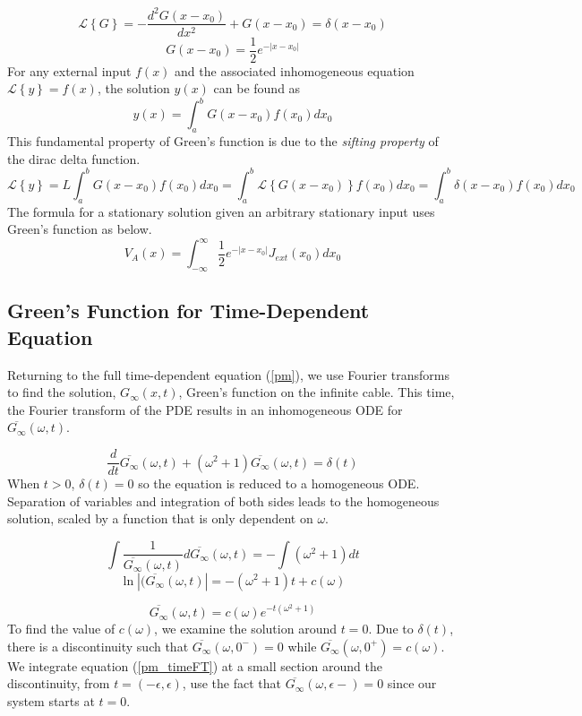 \documentclass[12pt]{article}
\begin{document}
\begin{equation} \label{pm_greens}
\mathcal{L}\left\{G\right\} = -\frac{d^2{G(x-x_0)}}{d{x^2}} + G(x-x_0) = \delta(x-x_0)
\end{equation}
$$ G(x-x_0) = \frac{1}{2}e^{-| x-x_0 |} $$
For any external input $f(x)$ and the associated inhomogeneous equation $\mathcal{L}\left\{y\right\} = f(x)$, the solution $y(x)$ can be found as
$$ y(x) = \int_{a}^{b}G(x-x_0)f(x_0)dx_0 $$
This fundamental property of Green's function is due to the \textit{sifting property} of the dirac delta function. 
$$\mathcal{L}\left\{y\right\} = L\int_a^bG(x-x_0)f(x_0)dx_0 = \int_a^b\mathcal{L}\left\{G(x-x_0)\right\}f(x_0)dx_0 = \int_a^b\delta(x-x_0)f(x_0)dx_0 $$
The formula for a stationary solution given an arbitrary stationary input uses Green's function as below.
$$V_A(x) = \int_{-\infty}^{\infty}\frac{1}{2}e^{-|x-x_0|}J_{ext}(x_0)dx_0 $$

\subsection{Green's Function for Time-Dependent Equation}
Returning to the full time-dependent equation (\ref{pm}), we use Fourier transforms to find the solution, $G_{\infty}(x,t)$, Green's function on the infinite cable. This time, the Fourier transform of the PDE results in an inhomogeneous ODE for $\overline{G_{\infty}}(\omega,t)$.

\begin{equation}\label{pm_timeFT}
\frac{d}{dt}\overline{G_{\infty}}(\omega,t) + (\omega^2+1)\overline{G_{\infty}}(\omega,t) = \delta(t) 
\end{equation} 
When $t>0$, $\delta(t) = 0$ so the equation is reduced to a homogeneous ODE. Separation of variables and integration of both sides leads to the homogeneous solution, scaled by a function that is only dependent on $\omega$.

$$ \int\frac{1}{\overline{G_{\infty}}(\omega,t)}d\overline{G_{\infty}}(\omega,t) = -\int(\omega^2 + 1)dt $$
$$ \ln|(\overline{G_{\infty}}(\omega,t)| = -(\omega^2+1)t + c(\omega) $$
 
$$\overline{G_{\infty}}(\omega,t) = c(\omega)e^{-t(\omega^2+1)} $$
To find the value of $c(\omega)$, we examine the solution around $t=0$. Due to $\delta(t)$, there is a discontinuity such that $\overline{G_{\infty}}(\omega,0^-) = 0$ while $\overline{G_{\infty}}(\omega,0^+) = c(\omega)$. We integrate equation (\ref{pm_timeFT}) at a small section around the discontinuity, from $t=(-\epsilon, \epsilon)$, use the fact that $\overline{G_{\infty}}(\omega,\epsilon-) = 0$ since our system starts at $t=0$. 
\end{document}
